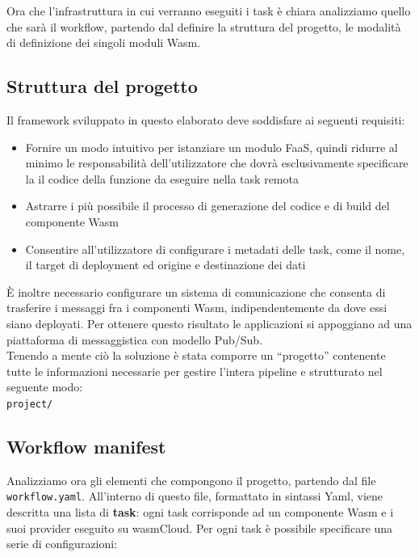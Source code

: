 Ora che l'infrastruttura in cui verranno eseguiti i task è chiara analizziamo quello che sarà il workflow, partendo dal definire la struttura del progetto, le modalità di definizione dei singoli moduli Wasm.

 \subsection{Struttura del progetto}
\label{sec:framework_structure}

Il framework sviluppato in questo elaborato deve soddisfare ai seguenti requisiti:
\begin{itemize}
    \item Fornire un modo intuitivo per istanziare un modulo FaaS, quindi ridurre al minimo le responsabilità dell'utilizzatore che dovrà esclusivamente specificare la il codice della funzione da eseguire nella task remota
    \item Astrarre i più possibile il processo di generazione del codice e di build del componente Wasm
    \item Consentire all'utilizzatore di configurare i metadati delle task, come il nome, il target di deployment ed origine e destinazione dei dati
\end{itemize}
È inoltre necessario configurare un sistema di comunicazione che consenta di trasferire i messaggi fra i componenti Wasm, indipendentemente da dove essi siano deployati. Per ottenere questo risultato le applicazioni si appoggiano ad una piattaforma di messaggistica con modello Pub/Sub.\\
Tenendo a mente ciò la soluzione è stata comporre un ``progetto'' contenente tutte le informazioni necessarie per gestire l'intera pipeline e strutturato nel seguente modo:\\

\texttt{project/}

\vspace{0.5cm}

\subsection{Workflow manifest}

Analizziamo ora gli elementi che compongono il progetto, partendo dal file \texttt{workflow.yaml}.
All'interno di questo file, formattato in sintassi Yaml, viene descritta una lista di \textbf{task}: ogni task corrisponde ad un componente Wasm e i suoi provider eseguito su wasmCloud. Per ogni task è possibile specificare una serie di configurazioni:

